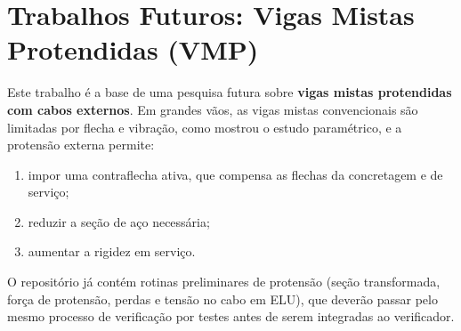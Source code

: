 \section{Trabalhos Futuros: Vigas Mistas Protendidas (VMP)}\label{sec:5.3}
Este trabalho é a base de uma pesquisa futura sobre \textbf{vigas mistas protendidas com cabos externos}. Em grandes vãos, as vigas mistas convencionais são limitadas por flecha e vibração, como mostrou o estudo paramétrico, e a protensão externa permite:
\begin{enumerate}
\item impor uma contraflecha ativa, que compensa as flechas da concretagem e de serviço;
\item reduzir a seção de aço necessária;
\item aumentar a rigidez em serviço.
\end{enumerate}

O repositório já contém rotinas preliminares de protensão (seção transformada, força de protensão, perdas e tensão no cabo em ELU), que deverão passar pelo mesmo processo de verificação por testes antes de serem integradas ao verificador.
